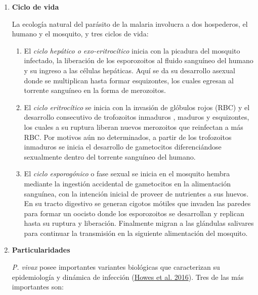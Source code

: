 \documentclass[
  a4paper]{article}
\providecommand{\tightlist}{%
  \setlength{\itemsep}{0pt}\setlength{\parskip}{0pt}}
\begin{document}
\begin{enumerate}
  \begin{enumerate}
  \def\labelenumii{\roman{enumii}.}
  \item
    \textbf{Ciclo de vida}

    La ecología natural del parásito de la malaria involucra a dos
    hospederos, el humano y el mosquito, y tres ciclos de vida:

    \begin{enumerate}
    \def\labelenumiii{\arabic{enumiii}.}
    \tightlist
    \item
      El \emph{ciclo hepático o exo-eritrocítico} inicia con la picadura
      del mosquito infectado, la liberación de los esporozoitos al
      fluido sanguíneo del humano y su ingreso a las células hepáticas.
      Aquí se da su desarrollo asexual donde se multiplican hasta formar
      esquizontes, los cuales egresan al torrente sanguíneo en la forma
      de merozoitos.
    \item
      El \emph{ciclo eritrocítico} se inicia con la invasión de glóbulos
      rojos (RBC) y el desarrollo consecutivo de trofozoitos inmaduros ,
      maduros y esquizontes, los cuales a su ruptura liberan nuevos
      merozoitos que reinfectan a más RBC. Por motivos aún no
      determinados, a partir de los trofozoitos inmaduros se inicia el
      desarrollo de gametocitos diferenciándose sexualmente dentro del
      torrente sanguíneo del humano.
    \item
      El \emph{ciclo esporogónico} o fase sexual se inicia en el
      mosquito hembra mediante la ingestión accidental de gametocitos en
      la alimentación sanguínea, con la intención inicial de proveer de
      nutrientes a sus huevos. En su tracto digestivo se generan cigotos
      mótiles que invaden las paredes para formar un oocisto donde los
      esporozoitos se desarrollan y replican hasta su ruptura y
      liberación. Finalmente migran a las glándulas salivares para
      continuar la transmisión en la siguiente alimentación del
      mosquito.
    \end{enumerate}
  \item
    \textbf{Particularidades}

    \emph{P. vivax} posee importantes variantes biológicas que
    caracterizan su epidemiología y dinámica de infección
    (\protect\hyperlink{ref-howes2016global}{Howes et al. 2016}). Tres
    de las más importantes son:


\end{enumerate}
\end{enumerate}
\end{document}
